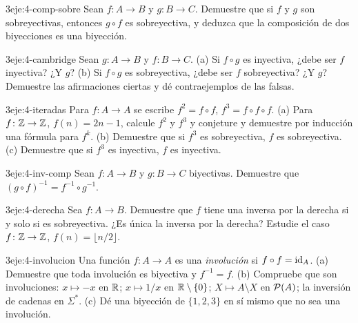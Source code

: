 \begin{ejercicio}{3}{eje:4-comp-sobre}
Sean $f\colon A\to B$ y $g\colon B\to C$. Demuestre que si $f$ y $g$ son sobreyectivas, entonces $g\circ f$ es sobreyectiva, y deduzca que la composición de dos biyecciones es una biyección.
\end{ejercicio}

\begin{ejercicio}{3}{eje:4-cambridge}
Sean $g\colon A\to B$ y $f\colon B\to C$. (a) Si $f\circ g$ es inyectiva, ¿debe ser $f$ inyectiva? ¿Y $g$? (b) Si $f\circ g$ es sobreyectiva, ¿debe ser $f$ sobreyectiva? ¿Y $g$? Demuestre las afirmaciones ciertas y dé contraejemplos de las falsas.
\end{ejercicio}

\begin{ejercicio}{3}{eje:4-iteradas}
Para $f\colon A\to A$ se escribe $f^{2}=f\circ f$, $f^{3}=f\circ f\circ f$. (a) Para $f\colon\mathbb{Z}\to\mathbb{Z}$, $f(n)=2n-1$, calcule $f^{2}$ y $f^{3}$ y conjeture y demuestre por inducción una fórmula para $f^{k}$. (b) Demuestre que si $f^{3}$ es sobreyectiva, $f$ es sobreyectiva. (c) Demuestre que si $f^{3}$ es inyectiva, $f$ es inyectiva.
\end{ejercicio}

\begin{ejercicio}{3}{eje:4-inv-comp}
Sean $f\colon A\to B$ y $g\colon B\to C$ biyectivas. Demuestre que $(g\circ f)^{-1}=f^{-1}\circ g^{-1}$.
\end{ejercicio}

\begin{ejercicio}{3}{eje:4-derecha}
Sea $f\colon A\to B$. Demuestre que $f$ tiene una inversa por la derecha si y solo si es sobreyectiva. ¿Es única la inversa por la derecha? Estudie el caso $f\colon\mathbb{Z}\to\mathbb{Z}$, $f(n)=\lfloor n/2\rfloor$.
\end{ejercicio}

\begin{ejercicio}{3}{eje:4-involucion}
Una función $f\colon A\to A$ es una \emph{involución} si $f\circ f=\mathrm{id}_A$. (a) Demuestre que toda involución es biyectiva y $f^{-1}=f$. (b) Compruebe que son involuciones: $x\mapsto-x$ en $\mathbb{R}$; $x\mapsto1/x$ en $\mathbb{R}\setminus\{0\}$; $X\mapsto A\setminus X$ en $\mathcal{P}(A)$; la inversión de cadenas en $\Sigma^{*}$. (c) Dé una biyección de $\{1,2,3\}$ en sí mismo que no sea una involución.
\end{ejercicio}

